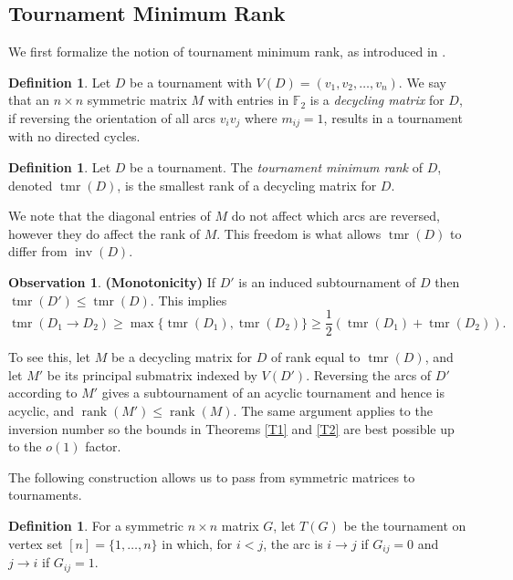 \documentclass[a4paper, 12pt, reqno]{amsart}
\numberwithin{equation}{section}
\theoremstyle{plain}
\theoremstyle{remark}
\theoremstyle{definition}
\newtheorem{defn}[thm]{Definition}
\newtheorem{obs}[thm]{Observation}
\newcommand{\tmr}{\operatorname{tmr}}
\newcommand{\rank}{\operatorname{rank}}
\newcommand{\inv}{\operatorname{inv}}
\begin{document}
  
\subsection{Tournament Minimum Rank}\label{sec:tmr}
We first formalize the notion of tournament minimum rank, as introduced in \cite{Natnote}.

\begin{defn}
    Let $D$ be a tournament with $V(D)=(v_1,v_2,\dots,v_n)$. We say that an $n\times n$ symmetric matrix $M$ with entries in $\mathbb{F}_2$ is a \emph{decycling matrix} for $D$, if reversing the orientation of all arcs $v_iv_j$ where $m_{ij}=1$, results in a tournament with no directed cycles.     
\end{defn}
\begin{defn}
Let $D$ be a tournament. The \emph{tournament minimum rank} of $D$, denoted $\tmr(D)$, is the smallest rank of a decycling matrix for $D$.
\end{defn} 

We note that the diagonal entries of $M$ do not affect which arcs are reversed, however they do affect the rank of $M$. This freedom is what allows $\tmr(D)$ to differ from $\inv(D)$. 

\begin{obs} \textbf{(Monotonicity)}
    If $D'$ is an induced subtournament of $D$ then $\tmr(D') \leq \tmr(D)$. This implies
    \begin{equation*}
        \tmr(D_1 \to D_2) \ge \max\{\tmr(D_1),\tmr(D_2)\} \ge \frac{1}{2} ( \tmr(D_1) + \tmr(D_2)).
    \end{equation*}
\end{obs}

To see this, let $M$ be a decycling matrix for $D$ of rank equal to $\tmr(D)$, and let $M'$ be its principal submatrix indexed by $V(D')$. Reversing the arcs of $D'$ according to $M'$ gives a subtournament of an acyclic tournament and hence is acyclic, and $\rank(M') \leq \rank(M)$. The same argument applies to the inversion number so the bounds in Theorems \ref{T1} and \ref{T2} are best possible up to the $o(1)$ factor.

The following construction allows us to pass from symmetric matrices to tournaments.

\begin{defn}
    For a symmetric $n \times n$ matrix $G$, let $T(G)$ be the tournament on vertex set $[n] = \{1,\dots,n\}$ in which, for $i < j$, the arc is $i \to j$ if $G_{ij} = 0 $ and $j \to i$ if $G_{ij}=1$.
\end{defn}
\end{document}
